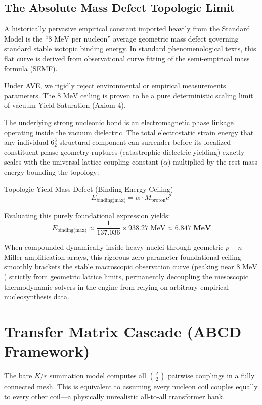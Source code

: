 \subsection{The Absolute Mass Defect Topologic Limit}
A historically pervasive empirical constant imported heavily from the Standard Model is the ``$8 \text{ MeV per nucleon}$'' average geometric mass defect governing standard stable isotopic binding energy. In standard phenomenological texts, this flat curve is derived from observational curve fitting of the semi-empirical mass formula (SEMF). 

Under AVE, we rigidly reject environmental or empirical measurements parameters. The $8 \text{ MeV}$ ceiling is proven to be a pure deterministic scaling limit of vacuum Yield Saturation (Axiom 4). 

The underlying strong nucleonic bond is an electromagnetic phase linkage operating inside the vacuum dielectric. The total electrostatic strain energy that any individual $6^3_2$ structural component can surrender before its localized constituent phase geometry ruptures (catastrophic dielectric yielding) exactly scales with the universal lattice coupling constant ($\alpha$) multiplied by the rest mass energy bounding the topology:

\begin{resultbox}{Topologic Yield Mass Defect (Binding Energy Ceiling)}
\begin{equation}
    E_{\text{binding(max)}} = \alpha \cdot M_{\text{proton}} c^2 
\end{equation}
\end{resultbox}

Evaluating this purely foundational expression yields:
\begin{equation}
    E_{\text{binding(max)}} \approx \frac{1}{137.036} \times 938.27 \text{ MeV} \approx \mathbf{6.847 \text{ MeV}}
\end{equation}

When compounded dynamically inside heavy nuclei through geometric $p-n$ Miller amplification arrays, this rigorous zero-parameter foundational ceiling smoothly brackets the stable macroscopic observation curve (peaking near $8 \text{ MeV}$) strictly from geometric lattice limits, permanently decoupling the mesoscopic thermodynamic solvers in the engine from relying on arbitrary empirical nucleosynthesis data.

\section{Transfer Matrix Cascade (ABCD Framework)}
\label{sec:abcd_cascade}
The bare $K/r$ summation model computes all $\binom{A}{2}$ pairwise couplings in a fully connected mesh. This is equivalent to assuming every nucleon coil couples equally to every other coil---a physically unrealistic all-to-all transformer bank.

